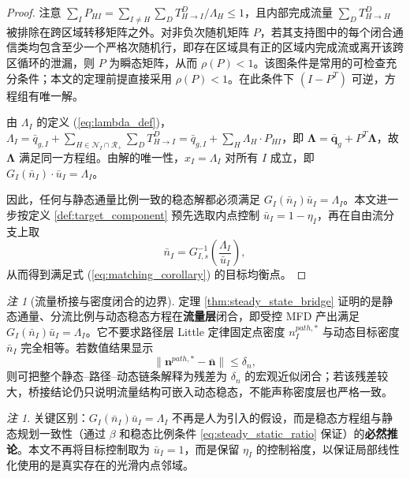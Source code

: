 \documentclass[a4paper,12pt]{article}
\theoremstyle{plain}
\theoremstyle{definition}
\theoremstyle{remark}
\newtheorem{remark}[theorem]{注}
\begin{document}
\begin{proof}
注意 $\sum_I P_{HI} = \sum_{I\ne H}\sum_D T_{H \to I}^D / \Lambda_H \leq 1$，且内部完成流量 $\sum_D T_{H \to H}^D$ 被排除在跨区域转移矩阵之外。对非负次随机矩阵 $P$，若其支持图中的每个闭合通信类均包含至少一个严格次随机行，即存在区域具有正的区域内完成流或离开该跨区循环的泄漏，则 $P$ 为瞬态矩阵，从而 $\rho(P)<1$。该图条件是常用的可检查充分条件；本文的定理前提直接采用 $\rho(P)<1$。在此条件下 $(I-P^T)$ 可逆，方程组有唯一解。

由 $\Lambda_I$ 的定义 (\ref{eq:lambda_def})，$\Lambda_I = \bar{q}_{g,I} + \sum_{H\in\mathcal N_I\cap\mathcal R_+} \sum_D T_{H \to I}^D = \bar{q}_{g,I} + \sum_H \Lambda_H \cdot P_{HI}$，即 $\bm{\Lambda} = \bar{\bm{q}}_g + P^T \bm{\Lambda}$，故 $\bm{\Lambda}$ 满足同一方程组。由解的唯一性，$x_I = \Lambda_I$ 对所有 $I$ 成立，即 $G_I(\bar{n}_I) \cdot \bar{u}_I = \Lambda_I$。

因此，任何与静态通量比例一致的稳态解都必须满足 $G_I(\bar n_I)\bar u_I=\Lambda_I$。本文进一步按定义 \ref{def:target_component} 预先选取内点控制 $\bar u_I=1-\eta_I$，再在自由流分支上取
\begin{equation}
    \bar n_I=G_{I,s}^{-1}\left(\frac{\Lambda_I}{\bar u_I}\right),
\end{equation}
从而得到满足式 (\ref{eq:matching_corollary}) 的目标均衡点。
\end{proof}

\begin{remark}[流量桥接与密度闭合的边界]\label{rem:flow_density_bridge_boundary}
定理 \ref{thm:steady_state_bridge} 证明的是静态通量、分流比例与动态稳态方程在\textbf{流量层}闭合，即受控 MFD 产出满足 $G_I(\bar n_I)\bar u_I=\Lambda_I$。它不要求路径层 Little 定律固定点密度 $n_I^{path,*}$ 与动态目标密度 $\bar n_I$ 完全相等。若数值结果显示
\begin{equation}
    \| \bm n^{path,*}-\bar{\bm n}\|\le \delta_n ,
\end{equation}
则可把整个静态--路径--动态链条解释为残差为 $\delta_n$ 的宏观近似闭合；若该残差较大，桥接结论仍只说明流量结构可嵌入动态稳态，不能声称密度层也严格一致。
\end{remark}

\begin{remark}
关键区别：$G_I(\bar{n}_I)\bar u_I = \Lambda_I$ 不再是人为引入的假设，而是稳态方程组与静态规划一致性（通过 $\beta$ 和稳态比例条件 \ref{eq:steady_static_ratio} 保证）的\textbf{必然推论}。本文不再将目标控制取为 $\bar u_I=1$，而是保留 $\eta_I$ 的控制裕度，以保证局部线性化使用的是真实存在的光滑内点邻域。
\end{remark}
\end{document}
